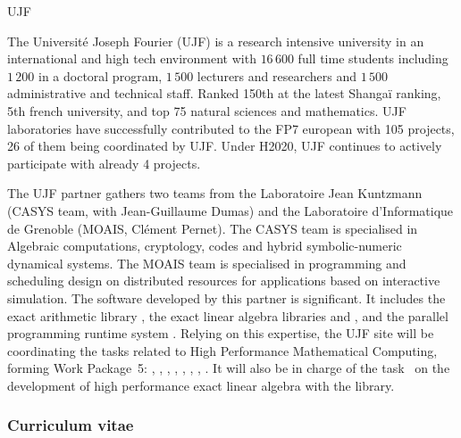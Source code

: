 \begin{sitedescription}{UJF}



The Université Joseph Fourier (UJF)  is a research intensive university in an
international and high tech environment with $16\,600$ full time students
including $1\,200$ in a doctoral program, $1\,500$ lecturers and researchers and
$1\,500$ administrative and technical staff. Ranked 150th at the latest Shanga\"i
ranking, 5th french university, and top 75 natural sciences and mathematics.
UJF laboratories have successfully contributed to the FP7 european with 
105 projects, 26 of them being coordinated by UJF. Under H2020, UJF continues to
actively participate with already 4 projects.

The UJF partner gathers two teams from the Laboratoire Jean Kuntzmann
(CASYS team, with Jean-Guillaume Dumas) and the Laboratoire d’Informatique de
Grenoble (MOAIS, Clément Pernet). The 
CASYS team is specialised in Algebraic computations, cryptology, codes and hybrid symbolic-numeric dynamical systems. The MOAIS team is specialised in programming and scheduling
design on distributed resources for applications based on interactive simulation. The software
developed by this partner is significant. It includes the exact arithmetic
library \Givaro, the exact linear algebra libraries \fflas and \Linbox, and the
parallel programming runtime system .
Relying on this expertise, the UJF site will be coordinating the tasks related
to High Performance Mathematical Computing, forming Work Package~5:
, 
, 
, 
,
, 
,
,
.
It will also be in charge of the task~ on the
development of high performance exact linear algebra with the \Linbox library.
\subsubsection*{Curriculum vitae}





%


\end{sitedescription}
